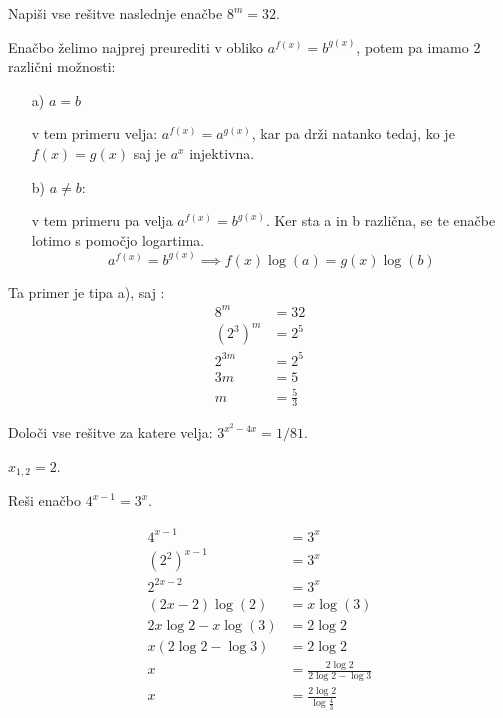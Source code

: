 \begin{vaja}
  Napiši vse rešitve naslednje enačbe \( 8^m=32\).

  \begin{odgovor}
   Enačbo želimo najprej  preurediti v obliko $a^{f(x)}=b^{g(x)}$, potem pa imamo 2 različni možnosti:
	\begin{itemize}
		\item[a)] $a=b$ 

			v tem primeru velja: $a^{f(x)}=a^{g(x)}$, kar pa drži natanko tedaj, ko je $f(x)=g(x)$ saj je $a^x$ injektivna.
			
		\item[b)] $a\neq b$:
			
			v tem primeru pa velja $a^{f(x)}=b^{g(x)}$. Ker sta a in b različna, se te enačbe lotimo s pomočjo logartima.
			$$a^{f(x)}=b^{g(x)}\implies f(x)\log(a)=g(x)\log(b)$$
	\end{itemize}
	
	Ta primer je tipa a), saj :
	\begin{align*}
		8^m&=32\\
		(2^3)^m&=2^5\\
		2^{3m}&=2^5\\
		3m&=5\\
		m&=\frac{5}{3}
	\end{align*}
  \end{odgovor}
\end{vaja}


\begin{vaja}
	Določi vse rešitve za katere velja: \(3^{x^2-4x}=1/81\).
  \begin{odgovor}$x_{1,2}=2$.
  \end{odgovor}
\end{vaja}


\begin{vaja}
  Reši enačbo $4^{x-1}=3^x$.

  \begin{odgovor}
	\begin{align*}
	 4^{x-1}&=3^x\\
	 (2^2)^{x-1}&=3^x\\
	 2^{2x-2}&=3^x\\
	 (2x-2)\log(2)&=x\log(3)\\
	 2x\log2-x\log(3)&=2\log2\\
	 x(2\log2-\log3)&=2\log2\\
	 x&=\frac{2\log2}{2\log2-\log3}\\
	 x&=\frac{2\log2}{\log{\frac{4}{3}}}
	\end{align*}    
  \end{odgovor}
\end{vaja}

